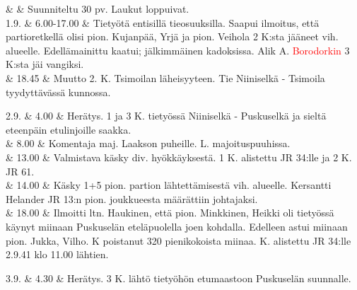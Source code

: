 \documentclass[11pt,a5paper,oneside]{book}
\begin{document}

& & Suunniteltu 30 pv. Laukut loppuivat. \newline\newline \\

1.9. & 6.00-17.00 & Tietyötä entisillä tieosuuksilla. \newline Saapui ilmoitus, että partioretkellä olisi pion. Kujanpää, Yrjä ja pion. Veihola 2 K:sta jääneet vih. alueelle. Edellämainittu kaatui; jälkimmäinen kadoksissa. Alik A. \textcolor{red}{Borodorkin} 3 K:sta jäi vangiksi. \newline \\

& 18.45 & Muutto 2. K. Tsimoilan läheisyyteen. Tie Niiniselkä - Tsimoila tyydyttävässä kunnossa. \\
\newpage

2.9. & 4.00 & Herätys. 1 ja 3 K. tietyössä Niiniselkä - Puskuselkä ja sieltä eteenpäin etulinjoille saakka. \newline \\

& 8.00 & Komentaja maj. Laakson puheille.  L. majoituspuuhissa. \newline \\

& 13.00 & Valmistava käsky div. hyökkäyksestä. 1 K. alistettu JR 34:lle ja 2 K. JR 61. \newline \\

& 14.00 & Käsky 1+5 pion. partion lähtettämisestä vih. alueelle. Kersantti Helander JR 13:n pion. joukkueesta määrättiin johtajaksi. \newline \\

& 18.00 & Ilmoitti ltn. Haukinen, että pion. Minkkinen, Heikki oli tietyössä käynyt miinaan Puskuselän eteläpuolella joen kohdalla. Edelleen astui miinaan pion. Jukka, Vilho.  K poistanut 320 pienikokoista miinaa.  K. alistettu JR 34:lle 2.9.41 klo 11.00 lähtien. \\

\taulustop


3.9. & 4.30 & Herätys. 3 K. lähtö tietyöhön etumaastoon Puskuselän suunnalle. \\
\end{document}
